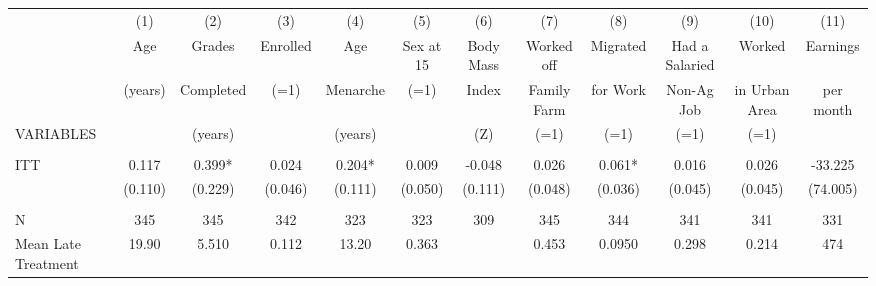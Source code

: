 \begin{tabular}{lccccccccccc} \hline
 & (1) & (2) & (3) & (4) & (5) & (6) & (7) & (8) & (9) & (10) & (11) \\
 & Age & Grades & Enrolled & Age & Sex at 15 & Body Mass & Worked off & Migrated & Had a Salaried & Worked & Earnings \\
 & (years) & Completed & (=1) & Menarche & (=1) & Index & Family Farm & for Work & Non-Ag Job & in Urban Area & per month \\
VARIABLES &  & (years) &  & (years) &  & (Z) & (=1) & (=1) & (=1) & (=1) &  \\ \hline
 &  &  &  &  &  &  &  &  &  &  &  \\
ITT & 0.117 & 0.399* & 0.024 & 0.204* & 0.009 & -0.048 & 0.026 & 0.061* & 0.016 & 0.026 & -33.225 \\
 & (0.110) & (0.229) & (0.046) & (0.111) & (0.050) & (0.111) & (0.048) & (0.036) & (0.045) & (0.045) & (74.005) \\
 &  &  &  &  &  &  &  &  &  &  &  \\
N & 345 & 345 & 342 & 323 & 323 & 309 & 345 & 344 & 341 & 341 & 331 \\
 Mean Late Treatment & 19.90 & 5.510 & 0.112 & 13.20 & 0.363 &  & 0.453 & 0.0950 & 0.298 & 0.214 & 474 \\ \hline
\end{tabular}
